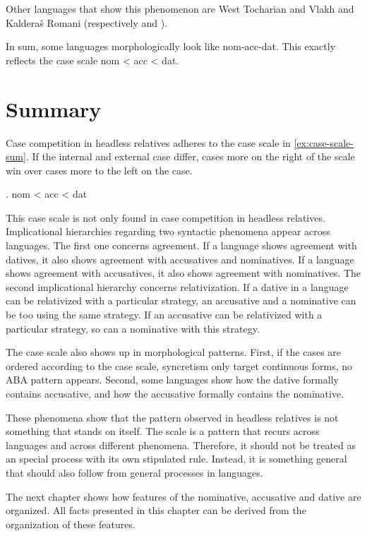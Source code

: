 Other languages that show this phenomenon are West Tocharian \citep{gippert1987} and Vlakh and Kalderaš Romani (respectively \citealt{friedman1991} and \citealt{boretzky1994}).

In sum, some languages morphologically look like \ac{nom}-\ac{acc}-\ac{dat}. This exactly reflects the case scale \ac{nom} < \ac{acc} < \ac{dat}.

\section{Summary}

Case competition in headless relatives adheres to the case scale in \ref{ex:case-scale-sum}. If the internal and external case differ, cases more on the right of the scale win over cases more to the left on the case.

\ex. \ac{nom} < \ac{acc} < \ac{dat}\label{ex:case-scale-sum}

This case scale is not only found in case competition in headless relatives. Implicational hierarchies regarding two syntactic phenomena appear across languages. The first one concerns agreement. If a language shows agreement with datives, it also shows agreement with accusatives and nominatives. If a language shows agreement with accusatives, it also shows agreement with nominatives.
The second implicational hierarchy concerns relativization. If a dative in a language can be relativized with a particular strategy, an accusative and a nominative can be too using the same strategy. If an accusative can be relativized with a particular strategy, so can a nominative with this strategy.

The case scale also shows up in morphological patterns. First, if the cases are ordered according to the case scale, syncretism only target continuous forms, no ABA pattern appears. Second, some languages show how the dative formally contains accusative, and how the accusative formally contains the nominative.

These phenomena show that the pattern observed in headless relatives is not something that stands on itself. The scale is a pattern that recurs across languages and across different phenomena. Therefore, it should not be treated as an special process with its own stipulated rule. Instead, it is something general that should also follow from general processes in languages.

The next chapter shows how features of the nominative, accusative and dative are organized. All facts presented in this chapter can be derived from the organization of these features.
